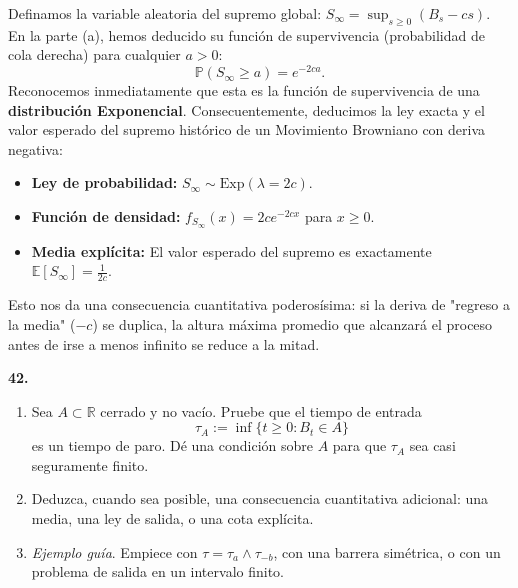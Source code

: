 \documentclass[11pt, letterpaper]{article}
\begin{document}
\begin{solucion}
    Definamos la variable aleatoria del supremo global: $S_\infty = \sup_{s \ge 0}(B_s - cs)$.
    En la parte (a), hemos deducido su función de supervivencia (probabilidad de cola derecha) para cualquier $a > 0$:
    \[ \mathbb{P}(S_\infty \ge a) = e^{-2ca}. \]
    Reconocemos inmediatamente que esta es la función de supervivencia de una \textbf{distribución Exponencial}.
    Consecuentemente, deducimos la ley exacta y el valor esperado del supremo histórico de un Movimiento Browniano con deriva negativa:
    \begin{itemize}
        \item \textbf{Ley de probabilidad:} $S_\infty \sim \text{Exp}(\lambda = 2c)$.
        \item \textbf{Función de densidad:} $f_{S_\infty}(x) = 2c e^{-2cx}$ para $x \ge 0$.
        \item \textbf{Media explícita:} El valor esperado del supremo es exactamente $\mathbb{E}[S_\infty] = \frac{1}{2c}$.
    \end{itemize}
    Esto nos da una consecuencia cuantitativa poderosísima: si la deriva de "regreso a la media" ($-c$) se duplica, la altura máxima promedio que alcanzará el proceso antes de irse a menos infinito se reduce a la mitad.
\end{solucion}

\newpage

\begin{ejercicio}
    \textbf{42.} 
    \begin{enumerate}
        \item Sea $A \subset \mathbb{R}$ cerrado y no vacío. Pruebe que el tiempo de entrada
        \[ \tau_A := \inf\{t \ge 0 : B_t \in A\} \]
        es un tiempo de paro. Dé una condición sobre $A$ para que $\tau_A$ sea casi seguramente finito.
        \item Deduzca, cuando sea posible, una consecuencia cuantitativa adicional: una media, una ley de salida, o una cota explícita.
        \item \textit{Ejemplo guía}. Empiece con $\tau = \tau_a \wedge \tau_{-b}$, con una barrera simétrica, o con un problema de salida en un intervalo finito.
    \end{enumerate}
\end{ejercicio}

\vspace{5mm}
\end{document}
